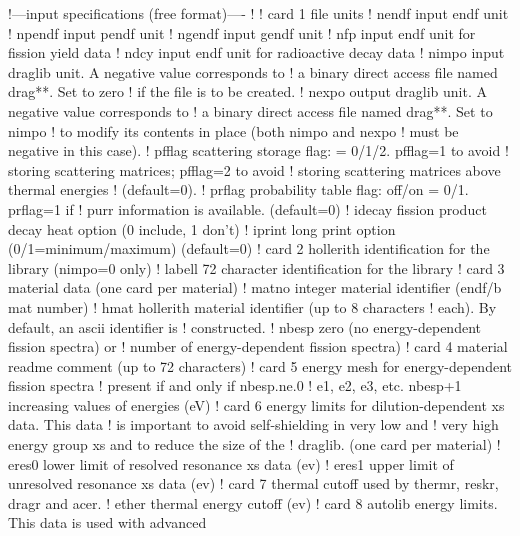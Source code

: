 \small
\begin{ccode}

   !---input specifications (free format)----
   !
   ! card 1 file units
   !   nendf     input endf unit
   !   npendf    input pendf unit
   !   ngendf    input gendf unit
   !   nfp       input endf unit for fission yield data
   !   ndcy      input endf unit for radioactive decay data
   !   nimpo     input draglib unit. A negative value corresponds to
   !             a binary direct access file named drag**. Set to zero
   !             if the file is to be created.
   !   nexpo     output draglib unit. A negative value corresponds to
   !             a binary direct access file named drag**. Set to nimpo
   !             to modify its contents in place (both nimpo and nexpo
   !             must be negative in this case).
   !   pfflag    scattering storage flag: = 0/1/2. pfflag=1 to avoid
   !             storing scattering matrices; pfflag=2 to avoid
   !             storing scattering matrices above thermal energies
   !             (default=0).
   !   prflag    probability table flag: off/on = 0/1. prflag=1 if
   !             purr information is available. (default=0)
   !   idecay    fission product decay heat option (0 include, 1 don't)
   !   iprint    long print option (0/1=minimum/maximum) (default=0)
   ! card 2 hollerith identification for the library (nimpo=0 only)
   !   labell    72 character identification for the library
   ! card 3 material data (one card per material)
   !   matno     integer material identifier (endf/b mat number)
   !   hmat      hollerith material identifier (up to 8 characters
   !             each). By default, an ascii identifier is
   !             constructed.
   !   nbesp     zero (no energy-dependent fission spectra) or
   !             number of energy-dependent fission spectra)
   ! card 4 material readme comment (up to 72 characters)
   ! card 5 energy mesh for energy-dependent fission spectra
   ! present if and only if nbesp.ne.0
   !   e1, e2, e3, etc. nbesp+1 increasing values of energies (eV)
   ! card 6 energy limits for dilution-dependent xs data. This data
   !        is important to avoid self-shielding in very low and
   !        very high energy group xs and to reduce the size of the
   !        draglib. (one card per material)
   !   eres0     lower limit of resolved resonance xs data (ev)
   !   eres1     upper limit of unresolved resonance xs data (ev)
   ! card 7 thermal cutoff used by thermr, reskr, dragr and acer.
   !   ether     thermal energy cutoff (ev)
   ! card 8 autolib energy limits. This data is used with advanced

\end{ccode}
